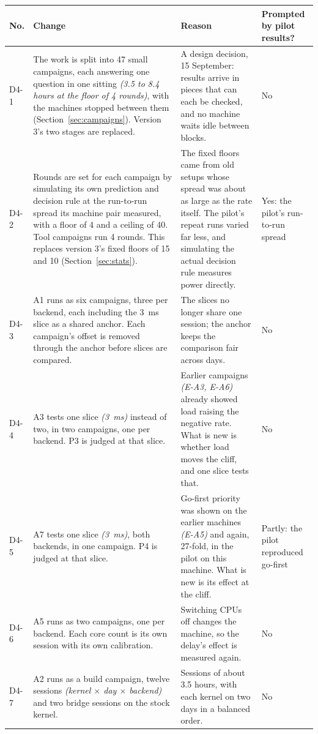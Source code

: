 \documentclass[11pt]{article}
\newcommand{\gl}[1]{{\color{soft}\itshape\small (#1)}}
\begin{document}
{\small
\begin{longtable}{@{}p{1.0cm} >{\raggedright\arraybackslash}p{6.6cm} >{\raggedright\arraybackslash}p{5.9cm} >{\raggedright\arraybackslash}p{1.9cm}@{}}
\toprule
\textbf{No.} & \textbf{Change} & \textbf{Reason} & \textbf{Prompted by pilot results?} \\
\midrule
\endhead
D4-1 & The work is split into 47 small campaigns, each answering one question in one sitting \gl{3.5 to 8.4 hours at the floor of 4 rounds}, with the machines stopped between them (Section~\ref{sec:campaigns}). Version 3's two stages are replaced. & A design decision, 15 September: results arrive in pieces that can each be checked, and no machine waits idle between blocks. & No \\
D4-2 & Rounds are set for each campaign by simulating its own prediction and decision rule at the run-to-run spread its machine pair measured, with a floor of 4 and a ceiling of 40. Tool campaigns run 4 rounds. This replaces version 3's fixed floors of 15 and 10 (Section~\ref{sec:stats}). & The fixed floors came from old setups whose spread was about as large as the rate itself. The pilot's repeat runs varied far less, and simulating the actual decision rule measures power directly. & Yes: the pilot's run-to-run spread \\
D4-3 & A1 runs as six campaigns, three per backend, each including the 3~ms slice as a shared anchor. Each campaign's offset is removed through the anchor before slices are compared. & The slices no longer share one session; the anchor keeps the comparison fair across days. & No \\
D4-4 & A3 tests one slice \gl{3~ms} instead of two, in two campaigns, one per backend. P3 is judged at that slice. & Earlier campaigns \gl{E-A3, E-A6} already showed load raising the negative rate. What is new is whether load moves the cliff, and one slice tests that. & No \\
D4-5 & A7 tests one slice \gl{3~ms}, both backends, in one campaign. P4 is judged at that slice. & Go-first priority was shown on the earlier machines \gl{E-A5} and again, 27-fold, in the pilot on this machine. What is new is its effect at the cliff. & Partly: the pilot reproduced go-first \\
D4-6 & A5 runs as two campaigns, one per backend. Each core count is its own session with its own calibration. & Switching CPUs off changes the machine, so the delay's effect is measured again. & No \\
D4-7 & A2 runs as a build campaign, twelve sessions \gl{kernel $\times$ day $\times$ backend} and two bridge sessions on the stock kernel. & Sessions of about 3.5 hours, with each kernel on two days in a balanced order. & No \\

\end{longtable}}
\end{document}
